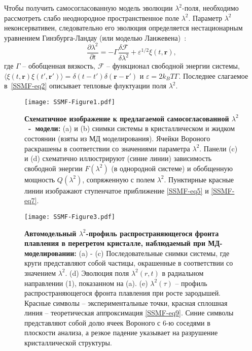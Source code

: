 Чтобы получить самосогласованную модель эволюции $ \lambda^2$-поля,
необходимо рассмотреть слабо неоднородное пространственное поле $\lambda^2$.
Параметр $\lambda ^ 2$ неконсервативен, следовательно его эволюция определяется нестационарным уравнением Гинзбурга-Ландау (или моделью Ланжевена)~\cite{book.desai}:
\begin{equation}
  \label{SSMF-eq4}
  \frac{\partial \lambda^2}{\partial t} = -\Gamma \frac{\delta \mathcal{F}}{\delta \lambda^2} + \varepsilon^{1/2}\xi(t,\mathbf{r}),
\end{equation}
где $\Gamma$ -- обобщенная вязкость, $ \mathcal{F} $ -- функционал свободной энергии системы, $\langle \xi(t,\mathbf{r})\xi(t',\mathbf{r}')\rangle = \delta(t-t')\delta(\mathbf{r}-\mathbf{r}')$ и $\varepsilon = 2k_BT\Gamma$.
Последнее слагаемое в~\eqref{SSMF-eq2} описывает тепловые флуктуации поля $\lambda^2$.

\begin{figure}[!t]
  \centering
  \texttt{[image: SSMF-Figure1.pdf]}
  \caption{\textbf{Схематичное изображение к предлагаемой самосогласованной $\lambda^2$~-~модели:}
    (a) и (b) снимки системы в кристаллическом и жидком состоянии (взяты из МД моделирования).
    Ячейки Вороного раскрашены в соответствии со значениями параметра $ \lambda^2$.
    Панели (c) и (d) схематично иллюстрируют (синие линии) зависимость свободной энергии $ F (\lambda ^ 2) $ (в однородной системе) и обобщенную мощность $ Q (\lambda ^ 2) $, сопряженную с полем $\lambda^2$.
    Пунктирные красные линии изображают ступенчатое приближение \eqref{SSMF-eq5} и \eqref{SSMF-eq7}.
  }
  \label{SSMF-Figure1}
\end{figure}


\begin{figure*}[!t]
  \centering
  \texttt{[image: SSMF-Figure3.pdf]}
  \caption{\textbf{Автомодельный $ \lambda^2$-профиль распространяющегося фронта плавления в перегретом кристалле, наблюдаемый при МД-моделировании:}
    (a) - (c) Последовательные снимки системы, где круги представляют собой частицы, окрашенные в соответствии со значением $\lambda^2$.
    (d) Эволюция поля $\lambda^2(r, t)$ в радиальном направлении (1), показанном на (a).
    (e) $\lambda^2(\tau)$ -- профиль распространяющегося фронта плавления при росте зародышей.
    Красные символы -- экспериментальные точки, красная сплошная линия -- теоретическая аппроксимация \eqref{SSMF-eq9}.
    Синие символы представляют собой долю ячеек Вороного с 6-ю соседями в плоскости анализа, а резкое падение указывает на разрушение кристаллической структуры.}
  \label{SSMF-Figure3}
\end{figure*}

